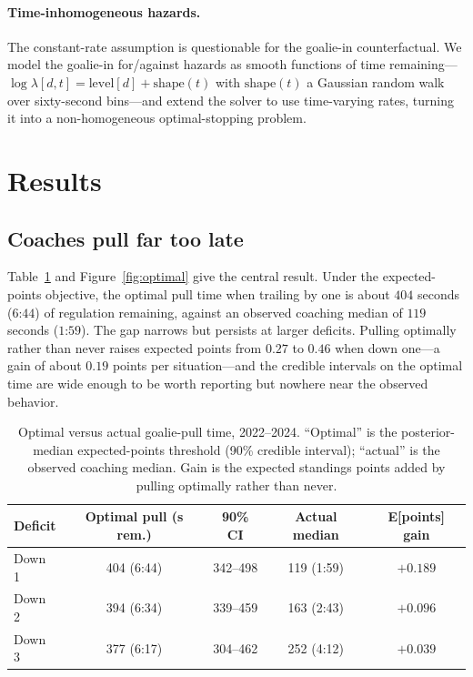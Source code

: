 \documentclass[11pt]{article}
\begin{document}
\paragraph{Time-inhomogeneous hazards.} The constant-rate assumption is
questionable for the goalie-in counterfactual. We model the goalie-in for/against
hazards as smooth functions of time remaining---$\log\lambda[d,t] =
\text{level}[d] + \text{shape}(t)$ with $\text{shape}(t)$ a Gaussian random walk
over sixty-second bins---and extend the solver to use time-varying rates, turning
it into a non-homogeneous optimal-stopping problem.

\section{Results}

\subsection{Coaches pull far too late}

Table~\ref{tab:main} and Figure~\ref{fig:optimal} give the central result. Under
the expected-points objective, the optimal pull time when trailing by one is about
$404$ seconds ($6$:$44$) of regulation remaining, against an observed coaching
median of $119$ seconds ($1$:$59$). The gap narrows but persists at larger
deficits. Pulling optimally rather than never raises expected points from $0.27$
to $0.46$ when down one---a gain of about $0.19$ points per situation---and the
credible intervals on the optimal time are wide enough to be worth reporting but
nowhere near the observed behavior.

\begin{table}[t]
\centering
\caption{Optimal versus actual goalie-pull time, 2022--2024. ``Optimal'' is the
posterior-median expected-points threshold (90\% credible interval); ``actual'' is
the observed coaching median. Gain is the expected standings points added by
pulling optimally rather than never.}
\label{tab:main}
\begin{tabular}{lcccc}
\toprule
Deficit & Optimal pull (s rem.) & 90\% CI & Actual median & E[points] gain \\
\midrule
Down 1 & 404 (6:44) & 342--498 & 119 (1:59) & $+0.189$ \\
Down 2 & 394 (6:34) & 339--459 & 163 (2:43) & $+0.096$ \\
Down 3 & 377 (6:17) & 304--462 & 252 (4:12) & $+0.039$ \\
\bottomrule
\end{tabular}
\end{table}
\end{document}
